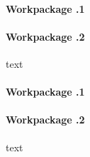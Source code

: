 

\paragraph{Workpackage .1}


\paragraph{Workpackage .2}

text



\paragraph{Workpackage .1}

\paragraph{Workpackage .2}

text

